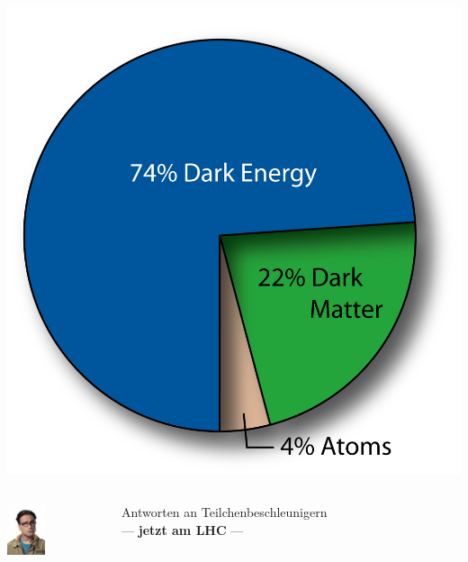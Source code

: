 \documentclass{beamer}
\begin{document}
\begin{frame}[t]
\begin{columns}
\begin{column}{0.3\textwidth}
      \includegraphics[width=\textwidth]{cosmology/MatterContentOfTheUniverse.jpg}
    \end{column}
  \end{columns}
  \pause
  \begin{block}{}
    \begin{columns}
      \begin{column}{0.2\textwidth}
        \centering
        \includegraphics[height=1.5cm]{eyecandy/Lennard}
      \end{column}
      \begin{column}{0.7\textwidth}
        \centering
        \alert{\Large Antworten an Teilchenbeschleunigern\\
          --- \textbf{jetzt am LHC} ---} 
      \end{column}
      \begin{column}{0.1\textwidth}
      \end{column}
    \end{columns}
  \end{block}
\end{frame}
\end{document}
